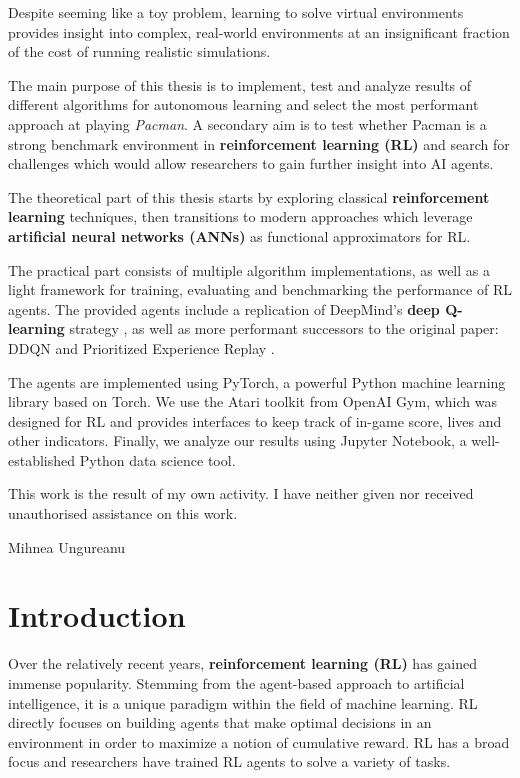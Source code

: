 \documentclass[12pt,twoside]{report}
\begin{document}
Despite seeming like a toy problem, learning to solve virtual environments provides insight into complex, real-world environments at an insignificant fraction of the cost of running realistic simulations.

The main purpose of this thesis is to implement, test and analyze results of different algorithms for autonomous learning and select the most performant approach at playing \emph{Pacman}.
A secondary aim is to test whether Pacman is a strong benchmark environment in \textbf{reinforcement learning (RL)} and search for challenges which would allow researchers to gain further insight into AI agents.

The theoretical part of this thesis starts by exploring classical \textbf{reinforcement learning} techniques, then transitions to modern approaches which leverage \textbf{artificial neural networks (ANNs)} as functional approximators for RL.

The practical part consists of multiple algorithm implementations, as well as a light framework for training, evaluating and benchmarking the performance of RL agents.
The provided agents include a replication of DeepMind’s \textbf{deep  Q-learning} strategy \cite{atari-dqn}, as well as more performant successors to the original paper: DDQN \cite{ddqn-paper} and Prioritized Experience Replay \cite{per-paper}.

The agents are implemented using PyTorch, a powerful Python machine learning library based on Torch. We use the Atari toolkit from OpenAI Gym, which was designed for RL and provides interfaces to keep track of in-game score, lives and other indicators.
Finally, we analyze our results using Jupyter Notebook, a well-established Python data science tool.

\hfill \break
This work is the result of my own activity. I have neither given nor received unauthorised assistance on this work.
\begin{flushright}
    Mihnea Ungureanu
\end{flushright}


\tableofcontents


\chapter{Introduction}
Over the relatively recent years, \textbf{reinforcement learning (RL)} has gained immense popularity.
Stemming from the agent-based approach to artificial intelligence, it is a unique paradigm within the field of machine learning.
RL directly focuses on building agents that make optimal decisions in an environment in order to maximize a notion of cumulative reward.
RL has a broad focus and researchers have trained RL agents to solve a variety of tasks.
\end{document}

